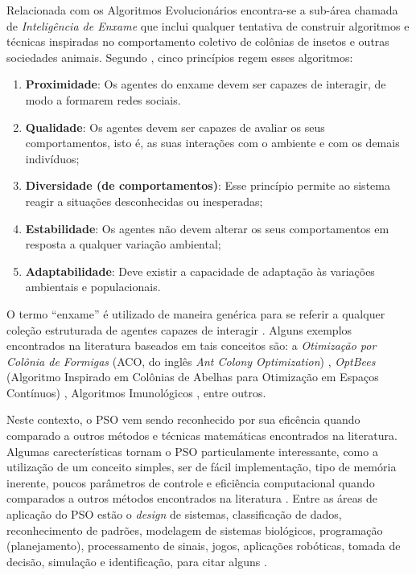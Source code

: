 \documentclass[
	12pt,				%
	openany,			%
	oneside,	
	a4paper,			%
	brazil,				%
	]{unimontes-ppgmsc-abntex2}
\begin{document}
Relacionada com os Algoritmos Evolucionários encontra-se a sub-área chamada de {\em Inteligência de Enxame} que inclui qualquer tentativa de construir algoritmos e técnicas inspiradas no comportamento coletivo de colônias de insetos e outras sociedades animais. Segundo , cinco princípios regem esses algoritmos:

\begin{enumerate}[label=(\roman*)]
\item \textbf{Proximidade}: Os agentes do enxame devem ser capazes de interagir, de modo a formarem redes sociais.
\item \textbf{Qualidade}: Os agentes devem ser capazes de avaliar os seus comportamentos, isto é, as suas interações com o ambiente e com os demais indivíduos;
\item \textbf{Diversidade (de comportamentos)}: Esse princípio permite ao sistema reagir a situações desconhecidas ou inesperadas;
\item \textbf{Estabilidade}: Os agentes não devem  alterar os seus comportamentos em resposta a qualquer variação ambiental;
\item \textbf{Adaptabilidade}: Deve existir a capacidade de adaptação às variações ambientais e populacionais.
\end{enumerate}

O termo ``enxame'' é utilizado de maneira genérica para se  referir a qualquer coleção estruturada de agentes capazes de interagir \cite{VonZuben_2007}. Alguns exemplos encontrados na literatura baseados em tais conceitos são: a {\em Otimização por Colônia de Formigas} (ACO, do inglês {\em Ant Colony Optimization}) \cite{Dorigo_1996}, {\em OptBees} (Algoritmo Inspirado em Colônias de Abelhas para Otimização em Espaços Contínuos) \cite{Renato_2013}, Algoritmos Imunológicos \cite{Castro_2002}, entre outros. 

Neste contexto, o PSO vem sendo reconhecido por sua eficência quando comparado a outros métodos e técnicas matemáticas encontrados na literatura. Algumas carecterísticas tornam o PSO particulamente interessante, como a utilização de um conceito simples, ser de fácil implementação, tipo de memória inerente, poucos parâmetros de controle e eficiência computacional quando comparados a outros métodos encontrados na literatura \cite{Valle_2008}. Entre as áreas de aplicação do PSO estão o {\em design} de sistemas, classificação de dados, reconhecimento de padrões, modelagem de sistemas biológicos, programação (planejamento), processamento de sinais, jogos, aplicações robóticas, tomada de decisão, simulação e identificação, para citar alguns \cite{Kennedy_2001}.
  
\end{document}
